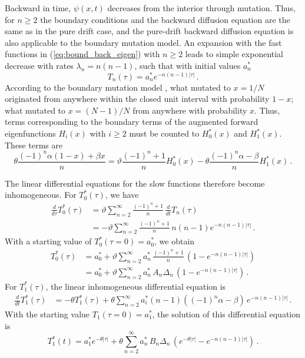 \documentclass[preprint]{elsarticle}
\begin{document}
Backward in time, $\psi(x,t)$ decreases from the interior through mutation. Thus, for $n\geq 2$ the boundary conditions and the backward diffusion equation are the same as in the pure drift case, and the pure-drift backward diffusion equation is also applicable to the boundary mutation model. An expansion with the fast functions in (\ref{eq:bound_back_eigen}) with $n\geq 2$ leads to simple exponential decrease with rates $\lambda_n=n(n-1)$, such that with initial values $a_n^{*}$
\begin{equation}
    T_n(\tau)=a_n^{*} e^{-n(n-1)|\tau|}\,.
\end{equation}
According to the boundary mutation model \citep{Vogl15}, what mutated to $x=1/N$ originated from anywhere within the closed unit interval with probability $1-x$; what mutated to $x=(N-1)/N$ from anywhere with probability $x$. Thus, terms corresponding to the boundary terms of the augmented forward eigenfunctions $H_i(x)$ with $i\geq 2$ must be counted to $H_0^{*}(x)$ and $H_1^{*}(x)$. These terms are
\begin{equation}
    \theta \frac{(-1)^n \alpha (1-x) +\beta x}{n}=\vartheta\frac{(-1)^n+1}{n}H_0^{*}(x)-\theta\frac{(-1)^n\alpha-\beta}{n}H_1^{*}(x)\,.
\end{equation}

The linear differential equations for the slow functions therefore become inhomogeneous.
For $T_0^{*}(\tau)$, we have
\begin{equation}
\begin{split}
    \frac{d}{d\tau} T_0^{*}(\tau)&=\vartheta\sum_{n=2}^\infty \frac{(-1)^n+1}{n}\,\frac{d}{dt} T_n(\tau)\\
    &=-\vartheta\sum_{n=2}^\infty \frac{(-1)^n+1}{n}\,n(n-1)e^{-n(n-1) |\tau|}\,.
\end{split}
\end{equation}
With a starting value of $T_0^{*}(\tau=0)=a_0^{*}$, we obtain
\begin{equation}
\begin{split}
    T_0^{*}(\tau)&=a_0^{*}+\vartheta\sum_{n=2}^\infty a_n^{*}\,\frac{(-1)^n+1}{n}\, (1- e^{-n(n-1) |\tau|})\\
        &=a_0^{*}+\vartheta\sum_{n=2}^\infty a_n^{*}\,A_n\Delta_n\, (1- e^{-n(n-1) |\tau|})\,.
\end{split}
\end{equation}
For $T_1^{*}(\tau)$, the linear inhomogeneous differential equation is 
\begin{equation}
\begin{split}
    \frac{d}{dt} T_1^{*}(\tau)&=-\theta T_1^{*} (\tau)
    +\theta\sum_{n=2}^\infty a_i^{*} (n-1)((-1)^n\alpha-\beta)\,e^{-n(n-1) |\tau|} \,.
\end{split}
\end{equation}
With the starting value $T_1(\tau=0)=a_1^{*}$, the solution of this differential equation is
\begin{equation}
    T_1^{*}(t)=a_1^{*} e^{-\theta |\tau|} 
    +\theta\sum_{n=2}^\infty a_n^{*}\,B_n\Delta_n\,  (e^{-\theta |\tau|}- e^{-n(n-1) |\tau|}) \,.
\end{equation}
\end{document}
